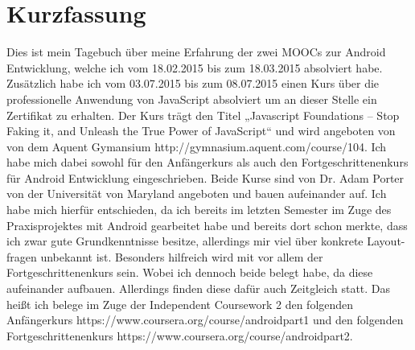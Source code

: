 \documentclass[12pt,a4paper,bibliography=totocnumbered,listof=totocnumbered]{scrartcl}
\begin{document}
\setcounter{page}{1}
\onehalfspacing
{}
\section{Kurzfassung}
Dies ist mein Tagebuch über meine Erfahrung der zwei MOOCs zur Android Entwicklung, welche ich vom 18.02.2015 bis zum 18.03.2015 absolviert habe.
Zusätzlich habe ich vom 03.07.2015 bis zum 08.07.2015 einen Kurs über die professionelle Anwendung von JavaScript absolviert um an dieser Stelle ein Zertifikat zu erhalten. Der Kurs trägt den Titel „Javascript Foundations – Stop Faking it, and Unleash the True Power of JavaScript“ und wird angeboten von von dem Aquent Gymansium \textcolor[rgb]{0,0,1}{http://gymnasium.aquent.com/course/104}. \newline
\newline
Ich habe mich dabei sowohl für den Anfängerkurs als auch den Fortgeschrittenenkurs für Android Entwicklung eingeschrieben.    
Beide Kurse sind von Dr. Adam Porter von der Universität von Maryland angeboten und bauen aufeinander auf.\newline
Ich habe mich hierfür entschieden, da ich bereits im letzten Semester im Zuge des Praxisprojektes mit Android gearbeitet habe und bereits dort schon merkte, dass ich zwar gute Grundkenntnisse besitze, allerdings mir viel über konkrete Layout-fragen unbekannt ist. Besonders hilfreich wird mit vor allem der Fortgeschrittenenkurs sein. Wobei ich dennoch beide belegt habe, da diese aufeinander aufbauen. Allerdings finden diese dafür auch Zeitgleich statt.\newline
Das heißt ich belege im Zuge der Independent Coursework 2 den folgenden Anfängerkurs \textcolor[rgb]{0,0,1}{https://www.coursera.org/course/androidpart1} und den folgenden Fortgeschrittenenkurs \textcolor[rgb]{0,0,1}{https://www.coursera.org/course/androidpart2}.

\pagebreak

\renewcommand{\cfttabpresnum}{Tab. }
\renewcommand{\cftfigpresnum}{Abb. }
\settowidth{\cfttabnumwidth}{Abb. 10\quad}
\settowidth{\cftfignumwidth}{Abb. 10\quad}
\end{document}
